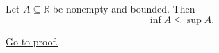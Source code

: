 \begin{theorem}
\label{thm:infimum-less-than-supremum}
Let $A\subseteq\mathbb{R}$ be nonempty and bounded. Then
\[
  \inf A\leq\sup A.
\]

\hyperref[prf:infimum-less-than-supremum]{Go to proof.}
\end{theorem}